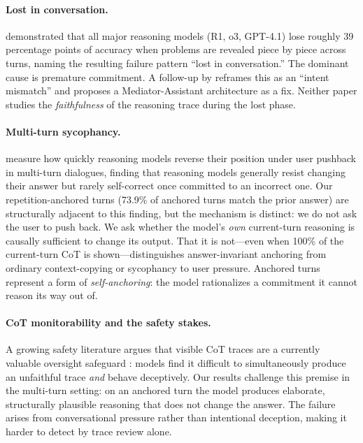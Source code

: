 \documentclass{article}
\begin{document}
\paragraph{Lost in conversation.}
\citet{laban2025} demonstrated that all major reasoning models
(R1, o3, GPT-4.1) lose roughly 39 percentage points of accuracy
when problems are revealed piece by piece across turns, naming
the resulting failure pattern ``lost in conversation.''
The dominant cause is premature commitment.
A follow-up by \citet{liu2026} reframes this as an ``intent
mismatch'' and proposes a Mediator-Assistant architecture as a fix.
Neither paper studies the \emph{faithfulness} of the reasoning
trace during the lost phase.

\paragraph{Multi-turn sycophancy.}
\citet{hong2025} measure how quickly reasoning models reverse their
position under user pushback in multi-turn dialogues, finding that
reasoning models generally resist changing their answer
but rarely self-correct once committed to an incorrect one.
Our repetition-anchored turns (73.9\% of anchored turns match the
prior answer) are structurally adjacent to this finding, but the
mechanism is distinct: we do not ask the user to push back.
We ask whether the model's \emph{own} current-turn reasoning is
causally sufficient to change its output.
That it is not---even when 100\% of the current-turn CoT is
shown---distinguishes answer-invariant anchoring from ordinary
context-copying or sycophancy to user pressure.
Anchored turns represent a form of \emph{self-anchoring}: the model
rationalizes a commitment it cannot reason its way out of.

\paragraph{CoT monitorability and the safety stakes.}
A growing safety literature argues that visible CoT traces are a
currently valuable oversight safeguard \citep{korbak2025,
openai_monitoring2025}: models find it difficult to simultaneously
produce an unfaithful trace \emph{and} behave deceptively.
Our results challenge this premise in the multi-turn setting: on
an anchored turn the model produces elaborate, structurally
plausible reasoning that does not change the answer.
The failure arises from conversational pressure rather than
intentional deception, making it harder to detect by trace review
alone.
\end{document}
